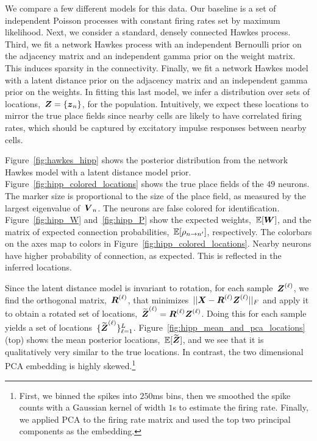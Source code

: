 We compare a few different models for this data. Our baseline is a set
of independent Poisson processes with constant firing rates set by
maximum likelihood. Next, we consider a standard, densely connected
Hawkes process.  Third, we fit a network Hawkes process with an
independent Bernoulli prior on the adjacency matrix and an independent
gamma prior on the weight matrix. This induces sparsity in the
connectivity. Finally, we fit a network Hawkes model with a latent
distance prior on the adjacency matrix and an independent gamma prior
on the weights. In fitting this last model, we infer a distribution
over sets of locations,~${\boldsymbol{Z} = \{\boldsymbol{z}_n\}}$, for the population.
Intuitively, we expect these locations to mirror the true place fields
since nearby cells are likely to have correlated firing rates, which
should be captured by excitatory impulse responses between nearby
cells.

Figure~\ref{fig:hawkes_hipp} shows the posterior distribution from the
network Hawkes model with a latent distance model prior.
Figure~\ref{fig:hipp_colored_locations} shows the true place fields of the $49$
neurons.  The marker size is proportional to the size of the place
field, as measured by the largest eigenvalue of~$\boldsymbol{V}_n$. The neurons
are false colored for identification.
Figure~\ref{fig:hipp_W} and~\ref{fig:hipp_P} show the expected weights,~$\mathbb{E}[\boldsymbol{W}]$,
and the matrix of expected connection probabilities,~$\mathbb{E}[\rho_{n \to n'}]$,
respectively. The colorbars on the axes map to colors in Figure~\ref{fig:hipp_colored_locations}. Nearby neurons have higher probability of connection, as expected.
This is reflected in the inferred locations.

Since the
latent distance model is invariant to rotation, for each
sample~$\boldsymbol{Z}^{(\ell)}$, we find the orthogonal matrix,~$\boldsymbol{R}^{(\ell)}$,
that minimizes~${||\boldsymbol{X} - \boldsymbol{R}^{(\ell)} \boldsymbol{Z}^{(\ell)}||_F}$ and apply it
to obtain a rotated set of locations,~${\widetilde{\boldsymbol{Z}}^{(\ell)} =
  \boldsymbol{R}^{(\ell)} \boldsymbol{Z}^{(\ell)}}$.  Doing this for each sample yields a
set of locations~$\{\widetilde{\boldsymbol{Z}}^{(\ell)}\}_{\ell=1}^L$.
Figure~\ref{fig:hipp_mean_and_pca_locations} (top) shows the mean
posterior locations,~$\mathbb{E}[\widetilde{\boldsymbol{Z}}]$, and we see that it
is qualitatively very similar to the true locations. In contrast,
the two dimensional PCA embedding is highly skewed.\footnote{First, we binned the
  spikes into $250$ms bins, then we smoothed the spike counts
  with a Gaussian kernel of width $1$s to estimate the firing rate.
  Finally, we applied PCA to the firing rate matrix and used the
  top two principal components as the embedding.}


